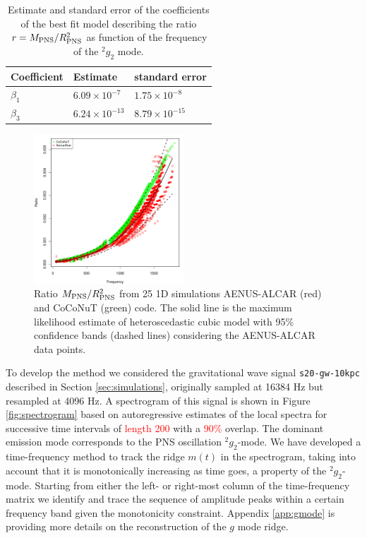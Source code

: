 \begin{table}[h]
  \begin{tabular}{lll}
    \hline
    Coefficient & Estimate & standard error \\
    \hline
    $\beta_1$   & $6.09 \times 10^{-7}$ & $1.75 \times 10^{-8}$ \\
    $\beta_3$   & $6.24 \times 10^{-13}$ & $8.79 \times 10^{-15}$ \\
    \hline
  \end{tabular}
\caption{Estimate and standard error of the coefficients of the best fit model describing the ratio $r=M_{\rm PNS}/R_{\rm PNS}^2$ as function of the frequency of the $\mbox{}^2g_2$ mode.}\label{tab:model}
\end{table}

\begin{figure}
 \centering
 \includegraphics[width=0.5\textwidth]{plots/model}
 \caption{Ratio $M_{\rm PNS}/R_{\rm PNS}^2$ from 25 1D simulations {\sc AENUS-ALCAR} (red) and {\sc CoCoNuT} (green) code. The solid line is the maximum likelihood estimate of heteroscedastic cubic model with 95\% confidence bands (dashed lines) considering the {\sc AENUS-ALCAR} data points.} \label{fig:LMVAR}
\end{figure}

To develop the method we considered the gravitational wave signal
{\tt s20-gw-10kpc} described in Section \ref{sec:simulations}, originally
sampled at 16384 Hz but resampled at 4096 Hz.
A spectrogram of this signal is shown in Figure \ref{fig:spectrogram} based on
autoregressive estimates of the local spectra for successive time intervals of 
\textcolor{red}{length 200} with a \textcolor{red}{ 90\%} overlap.
The dominant emission mode corresponds to the PNS oscillation $\mbox{}^2 g_2$-mode. We have
developed a time-frequency method to track the ridge $m(t)$ in the spectrogram,
taking into account that it is monotonically increasing as time goes,
a property of the $\mbox{}^2 g_2$-mode.
Starting from either the left- or right-most column of the time-frequency matrix
we identify and trace the sequence of amplitude peaks within a certain frequency
band given the monotonicity constraint. Appendix \ref{app:gmode} is providing more
details on the reconstruction of the $g$ mode ridge. 


